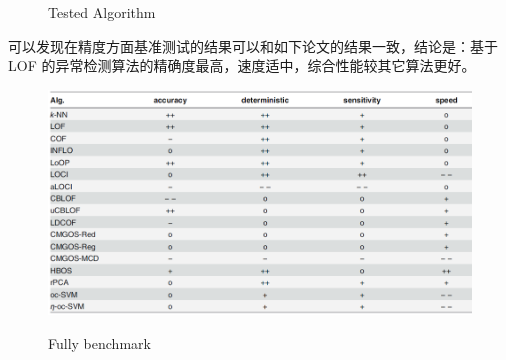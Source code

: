 \documentclass[UTF8]{ctexart}
\begin{document}
\begin{figure}[H]
\caption{Tested Algorithm}
\end{figure}

可以发现在精度方面基准测试的结果可以和如下论文的结果一致，结论是：基于 LOF 的异常检测算法的精确度最高，速度适中，综合性能较其它算法更好。

\begin{figure}[H] %
\centering %
\includegraphics[width=1.0\textwidth]{cite_benchmark1.png} %
\caption{Fully benchmark} %
\protect\cite{Goldstein2016ACE}
\end{figure}
    









\end{document}
